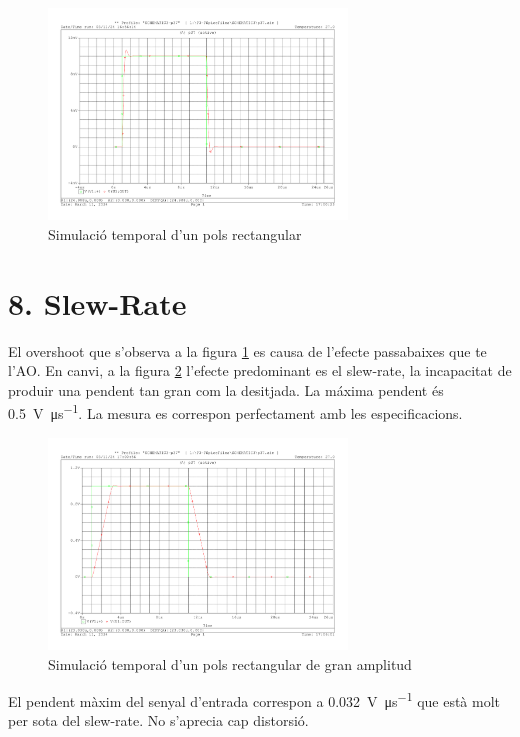 \documentclass[catalan, a4paper, nobib]{tufte-handout}
\begin{document}
\begin{figure}[h]
    \begin{center}
        \includegraphics[width=300px]{s2/7_1.pdf}
    \end{center}
    \caption{Simulació temporal d'un pols rectangular}
    \label{fig:q7}
\end{figure}

\section{8. Slew-Rate}
 El overshoot que s'observa a la figura \ref{fig:q7} es causa de l'efecte passabaixes que te l'AO. En canvi, a la figura \ref{fig:q8_1} l'efecte predominant es el slew-rate, la incapacitat de produir una pendent tan gran com la desitjada. La máxima pendent és \qty{0.5}{\volt\per\micro\second}. La mesura es correspon perfectament amb les especificacions.

\begin{figure}[h]
    \begin{center}
        \includegraphics[width=300px]{s2/8_1.pdf}
    \end{center}
    \caption{Simulació temporal d'un pols rectangular de gran amplitud}
    \label{fig:q8_1}
\end{figure}

 El pendent màxim del senyal d'entrada correspon a \qty{0.032}{\volt\per\micro\second} que està molt per sota del slew-rate. No s'aprecia cap distorsió.
\end{document}
